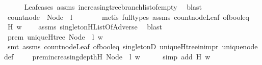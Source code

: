 \begin{isabellebody}
\ \ \ \ \isamarkupfalse%
\ Leaf{\isachardot}cases\ assms{\isacharparenleft}{}{\isacharparenright}\ increasing{\isacharunderscore}tree{\isacharunderscore}branch{\isacharunderscore}list{\isacharunderscore}of{\isacharunderscore}empty\ \isamarkupfalse%
\ blast\isanewline
\ \ \isamarkupfalse%
\ {\isachardoublequoteopen}count{\isacharunderscore}node\ {}\ {\isacharparenleft}Node\ {}\ l{\isacharparenright}\ {\isacharequal}\ {}{\isachardoublequoteclose}\isanewline
\ \ \ \ \isamarkupfalse%
\ {\isacharparenleft}metis\ {\isacharparenleft}full{\isacharunderscore}types{\isacharparenright}\ assms{\isacharparenleft}{}{\isacharparenright}\ count{\isacharunderscore}node{\isacharunderscore}Leaf\ of{\isacharunderscore}bool{\isacharunderscore}eq{\isacharparenleft}{}{\isacharparenright}{\isacharparenright}\isanewline
\ \ \isamarkupfalse%
\ {\isachardoublequoteopen}H\ w\ {\isacharequal}\ {\isacharbraceleft}{}{\isacharbraceright}{\isachardoublequoteclose}\ \isamarkupfalse%
\ assms{\isacharparenleft}{}{\isacharparenright}\ singleton{\isacharunderscore}H{\isacharunderscore}ListOfAdverse\ \isamarkupfalse%
\ blast\isanewline
\ \ \isamarkupfalse%
\ \isamarkupfalse%
\ prem{}{\isacharcolon}\ {\isachardoublequoteopen}uniqueH{\isacharunderscore}tree\ {\isacharparenleft}Node\ {}\ l{\isacharparenright}\ w{\isachardoublequoteclose}\ \isanewline
\ \ \ \ \isamarkupfalse%
\ {\isacharparenleft}smt\ assms{\isacharparenleft}{}{\isacharparenright}\ count{\isacharunderscore}node{\isacharunderscore}Leaf\ of{\isacharunderscore}bool{\isacharunderscore}eq{\isacharparenleft}{}{\isacharparenright}\ singletonD\ uniqueH{\isacharunderscore}tree{\isacharunderscore}in{\isacharunderscore}imp{\isacharunderscore}r\ unique{\isacharunderscore}node{\isacharunderscore}def{\isacharparenright}\ \isanewline
\ \ \isamarkupfalse%
\ prem{}{\isacharcolon}{\isachardoublequoteopen}increasing{\isacharunderscore}depth{\isacharunderscore}H\ {\isacharparenleft}Node\ {}\ l{\isacharparenright}\ w{\isachardoublequoteclose}\isanewline
\ \ \ \ \isamarkupfalse%
\ {\isacharparenleft}simp\ add{\isacharcolon}\ {\isacartoucheopen}H\ w\ {\isacharequal}\ {\isacharbraceleft}{}{\isacharbraceright}{\isacartoucheclose}{\isacharparenright}\isanewline
\ \ \isamarkupfalse%

\end{isabellebody}

